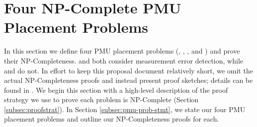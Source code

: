 \section{Four NP-Complete PMU Placement Problems}
\label{sec:problem-analysis}


In this section we define four PMU placement problems (\fulls, \maxincs, \xvals, and \xvalparts) and prove their NP-Completeness. 
\xval and \xvalpart both consider measurement error detection, while
\full and \maxinc do not.  In effort to keep this proposal document relatively short, we omit the actual NP-Completeness proofs and instead present proof sketches; details can 
be found in \cite{Gyllstrom12}.
We begin this section with a high-level description of the proof strategy we
use to prove each problem is NP-Complete (Section \ref{subsec:proofstrat}).  In Section \ref{subsec:pmu-prob-stmt}, we state our four PMU placement problems and outline our NP-Completeness proofs for each.


